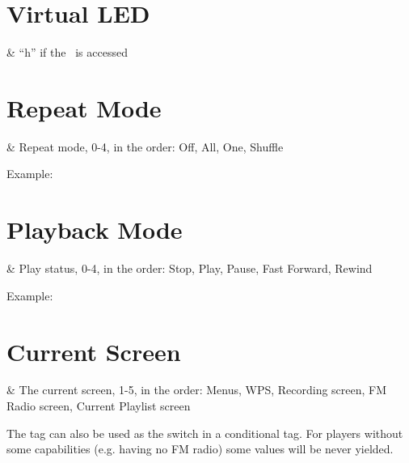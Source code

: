 \section{Virtual LED}
\begin{table}
  \begin{tagmap}{}{}
     & ``h'' if the \disk\ is accessed\\
  \end{tagmap}
\end{table}

\section{Repeat Mode}
\begin{table}
  \begin{tagmap}{}{}
     & Repeat mode, 0-4, in the order: Off, All, One, Shuffle
           \\
  \end{tagmap}
\end{table}
Example: 

\section{Playback Mode}
\begin{table}
  \begin{tagmap}{}{}
     & Play status, 0-4, in the order: Stop, Play, Pause, 
           Fast Forward, Rewind\\
  \end{tagmap}
\end{table}
Example: 

\section{Current Screen}
\begin{table}
  \begin{tagmap}{}{}
     & The current screen, 1-5, in the order:
                Menus, WPS, Recording screen, FM Radio screen, Current Playlist screen\\
  \end{tagmap}
\end{table}
The tag can also be used as the switch in a conditional tag. For players without
some capabilities (e.g. having no FM radio) some values will be never yielded.

